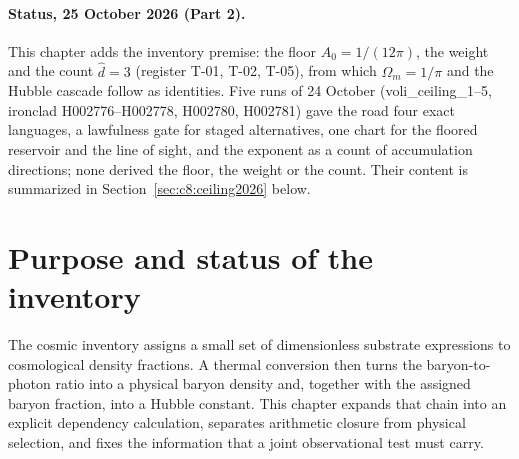 \begin{abstract}
The selected SAM inventory is developed as a reproducible chain from dimensionless container assignments to physical baryon density and a conditional Hubble constant. The clean and effective matter ledgers are kept separate, the baryonic allocation and abundance exponent are identified as unresolved physical selections, and the horizon projection's dimensional cancellation is restricted to its declared algebraic convention. The thermal conversion is derived explicitly, including its dependence on temperature, mass per baryon, and the critical-density relation. Sensitivity calculations distinguish numerical precision from theoretical uncertainty. The closing review's grammar enumeration is retained with its limits, while observational comparisons are framed as model-dependent tests rather than independent derivations. A frozen-packet protocol connects recombination, distance measurements, halos, and cosmic fate, with radiation-aware closure and an explicit dark-energy law. Independent abundance tests and input manifests provide a route to prospective falsification without inventing numerical runs or concealing previous selection choices.
\end{abstract}

\paragraph*{Status, 25 October 2026 (Part 2).} This chapter adds the inventory premise: the floor $A_0=1/(12\pi)$, the weight and the count $\hat d=3$ (register T-01, T-02, T-05), from which $\Omega_m=1/\pi$ and the Hubble cascade follow as identities. Five runs of 24 October (voli\_ceiling\_1--5, ironclad H002776--H002778, H002780, H002781) gave the road four exact languages, a lawfulness gate for staged alternatives, one chart for the floored reservoir and the line of sight, and the exponent as a count of accumulation directions; none derived the floor, the weight or the count. Their content is summarized in Section~\ref{sec:c8:ceiling2026} below.


\section{Purpose and status of the inventory}
The cosmic inventory assigns a small set of dimensionless substrate expressions to cosmological density fractions. A thermal conversion then turns the baryon-to-photon ratio into a physical baryon density and, together with the assigned baryon fraction, into a Hubble constant. This chapter expands that chain into an explicit dependency calculation, separates arithmetic closure from physical selection, and fixes the information that a joint observational test must carry.

